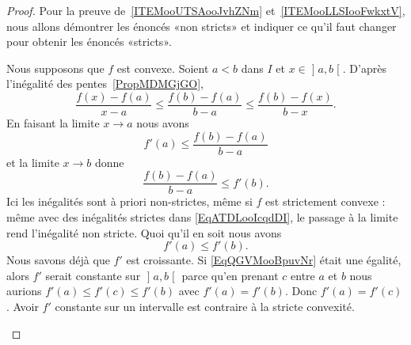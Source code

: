 \begin{proof}
	Pour la preuve de~\ref{ITEMooUTSAooJvhZNm} et~\ref{ITEMooLLSIooFwkxtV}, nous allons démontrer les énoncés «non stricts»  et indiquer ce qu'il faut changer pour obtenir les énoncés «stricts».
	\begin{subproof}
		Nous supposons que \( f\) est convexe. Soient \( a<b\) dans \( I\) et \( x\in\mathopen] a , b \mathclose[\). D'après l'inégalité des pentes~\ref{PropMDMGjGO},
			\begin{equation}        \label{EqATDLooIcqdDI}
				\frac{ f(x)-f(a) }{ x-a }\leq\frac{ f(b)-f(a) }{ b-a }\leq \frac{ f(b)-f(x) }{ b-x }.
			\end{equation}
			En faisant la limite \( x\to a\) nous avons
			\begin{equation}
				f'(a)\leq \frac{ f(b)-f(a) }{ b-a }
			\end{equation}
			et la limite \( x\to b\) donne
			\begin{equation}
				\frac{ f(b)-f(a) }{ b-a }\leq f'(b).
			\end{equation}
			Ici les inégalités sont à priori non-strictes, même si \( f\) est strictement convexe : même avec des inégalités strictes dans \eqref{EqATDLooIcqdDI}, le passage à la limite rend l'inégalité non stricte. Quoi qu'il en soit nous avons
			\begin{equation}        \label{EqQGVMooBpuvNr}
				f'(a)\leq f'(b).
			\end{equation}
			Nous savons déjà que \( f'\) est croissante. Si \eqref{EqQGVMooBpuvNr} était une égalité, alors \( f'\) serait constante sur \( \mathopen] a , b \mathclose[\) parce qu'en prenant \( c\) entre \( a\) et \( b\) nous aurions \( f'(a)\leq f'(c)\leq f'(b)\) avec \( f'(a)=f'(b)\). Donc \( f'(a)=f'(c)\). Avoir \( f'\) constante sur un intervalle est contraire à la stricte convexité.



\end{subproof}
\end{proof}
